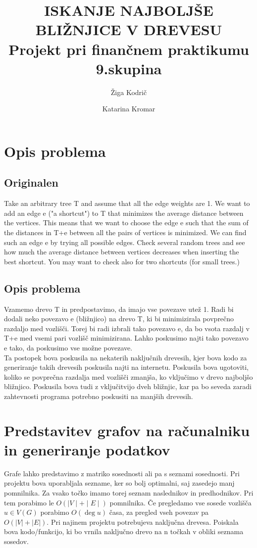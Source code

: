 \documentclass[a4paper,10pt]{article}
\begin{document}
\title{ ISKANJE NAJBOLJŠE BLIŽNJICE V DREVESU \\ \large Projekt pri finančnem praktikumu \\ 9.skupina}
\author{Žiga Kodrič \and Katarina Kromar}
\maketitle

\section{Opis problema}
\subsection{Originalen}
Take an arbitrary tree T and assume that all the edge weights are 1. We want to add an edge e ("a shortcut") to T that minimizes the average distance between the vertices. This means that we want to choose the edge e such that the sum of the distances in T+e between all the pairs of vertices is minimized. We can find such an edge e by trying all possible edges. Check several random trees and see how much the average distance between vertices decreases when inserting the best shortcut. You may want to check also for two shortcuts (for small trees.)

\subsection{Opis problema}
Vzamemo drevo T in predpostavimo, da imajo vse povezave utež 1. Radi bi dodali neko povezavo e (bližnjico) na drevo T, ki bi minimizirala povprečno razdaljo med vozlišči. Torej bi radi izbrali tako povezavo e, da bo vsota razdalj v T+e med vsemi pari vozlišč minimizirana. Lahko poskusimo najti tako povezavo e tako, da poskusimo vse možne povezave. 
\\[0.5cm]
Ta postopek bova poskusila na nekaterih naključnih drevesih, kjer bova kodo za generiranje takih drevesih poskusila najti na internetu. Poskusila bova ugotoviti, koliko se povprečna razdalja med vozlišči zmanjša, ko vključimo v drevo najboljšo bližnjico. Poskusila bova tudi z vključitvijo dveh bližnjic, kar pa bo seveda zaradi zahtevnosti programa potrebno poskusiti na manjših drevesih.

\section{Predstavitev grafov na računalniku in generiranje podatkov}
Grafe lahko predstavimo z matriko sosednosti ali pa s seznami sosednosti. Pri projektu bova uporabljala sezname, ker so bolj optimalni, saj zasedejo manj pomnilnika. Za vsako točko imamo torej seznam naslednikov in predhodnikov. Pri tem porabimo le $O(\mid V \mid + \mid E \mid)$ pomnilnika.
Če pregledamo vse sosede vozlišča $ u \in  V(G) $  porabimo $ O(\deg u)$ časa, za pregled vseh povezav pa $O(|V|+|E|)$.
Pri najinem projektu potrebujeva naključna drevesa. Poiskala bova kodo/funkcijo, ki bo vrnila naključno drevo na n točkah v obliki seznama sosedov.
\end{document}
